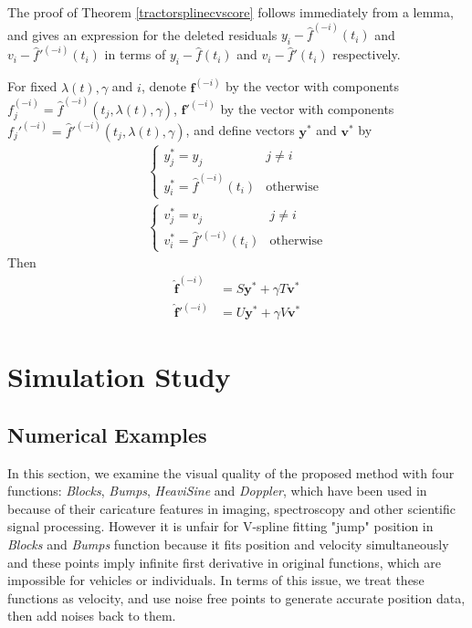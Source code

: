 The proof of Theorem \ref{tractorsplinecvscore} follows immediately from a lemma, and gives an expression for the deleted residuals $y_i-\hat{f}^{(-i)}(t_i)$ and $v_i-\hat{f}'^{(-i)}(t_i)$ in terms of $y_i-\hat{f}(t_i)$ and $v_i-\hat{f}'(t_i)$ respectively. 

\begin{lemma} \label{cvlemma}
For fixed $\lambda(t),\gamma$ and $i$, denote $\mathbf{f}^{(-i)}$ by the vector with components $f_j^{(-i)}=\hat{f}^{(-i)}\left(t_j,\lambda(t),\gamma\right)$,  $\mathbf{f}'^{(-i)}$ by the vector with components $f_j'^{(-i)}=\hat{f}'^{(-i)}\left(t_j,\lambda(t),\gamma\right)$, and define vectors $\mathbf{y}^*$ and $\mathbf{v}^*$ by 
\begin{align}
\begin{cases}
y_j^*=y_j &j \neq i\\
y_i^*=\hat{f}^{(-i)}(t_i) &\mbox{otherwise}
\end{cases}\\
\begin{cases}
v_j^*=v_j &j \neq i\\
v_i^*=\hat{f}'^{(-i)}(t_i) &\mbox{otherwise}
\end{cases}
\end{align}
Then
\begin{align}
\mathbf{\hat{f}}^{(-i)}&=S\mathbf{y}^*+\gamma T\mathbf{v}^*\\
\mathbf{\hat{f}}'^{(-i)}&=U\mathbf{y}^*+\gamma V\mathbf{v}^*
\end{align}
\end{lemma}


\section{Simulation Study} %


\subsection{Numerical Examples}

In this section, we examine the visual quality of the proposed method with four functions: \textit{Blocks}, \textit{Bumps}, \textit{HeaviSine} and \textit{Doppler}, which have been used in \citep{donoho1994ideal, donoho1995adapting, abramovich1998wavelet} because of their caricature features in imaging, spectroscopy and other scientific signal processing. However it is unfair for V-spline fitting "jump" position in \textit{Blocks} and \textit{Bumps} function because it fits position and velocity simultaneously and these points imply infinite first derivative in original functions, which are impossible for vehicles or individuals. In terms of this issue, we treat these functions as velocity, and use noise free points to generate accurate position data, then add noises back to them.

